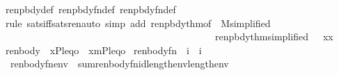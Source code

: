 \begin{isabellebody}
\ renpbdy{\isacharunderscore}{\kern0pt}def\ renpbdy{\isacharunderscore}{\kern0pt}fn{\isacharunderscore}{\kern0pt}def\ renpbdy{}{\isacharunderscore}{\kern0pt}fn{\isacharunderscore}{\kern0pt}def\isanewline
\ \ \isamarkupfalse%
\ {\isacharparenleft}{\kern0pt}rule\ sats{\isacharunderscore}{\kern0pt}iff{\isacharunderscore}{\kern0pt}sats{\isacharunderscore}{\kern0pt}ren{\isacharcomma}{\kern0pt}auto\ simp\ add{\isacharcolon}{\kern0pt}\ renpbdy{}{\isacharunderscore}{\kern0pt}thm{\isacharparenleft}{\kern0pt}{}{\isacharparenright}{\kern0pt}{\isacharbrackleft}{\kern0pt}of\ {\isacharunderscore}{\kern0pt}\ M{\isacharcomma}{\kern0pt}simplified{\isacharbrackright}{\kern0pt}\isanewline
\ \ \ \ \ \ \ \ \ \ \ \ \ \ \ \ \ \ \ \ \ \ \ \ \ \ \ \ \ \ \ \ \ \ \ \ \ \ \ \ \ \ \ \ renpbdy{}{\isacharunderscore}{\kern0pt}thm{\isacharparenleft}{\kern0pt}{}{\isacharparenright}{\kern0pt}{\isacharbrackleft}{\kern0pt}simplified{\isacharcomma}{\kern0pt}\ {\isasymalpha}{\isacharequal}{\kern0pt}{\isasymalpha}\ \ x{\isacharequal}{\kern0pt}x{\isacharbrackright}{\kern0pt}{\isacharparenright}{\kern0pt}%
\endisatagproof
{\isafoldproof}%
%
\isadelimproof
\isanewline
%
\endisadelimproof
\isanewline
%
\isadelimML
\isanewline
%
\endisadelimML
%
\isatagML
{}\isamarkupfalse%
\ {\isachardoublequoteopen}renbody{}{\isachardoublequoteclose}\ \ {\isachardoublequoteopen}{\isacharbrackleft}{\kern0pt}x{\isacharcomma}{\kern0pt}{\isasymalpha}{\isacharcomma}{\kern0pt}P{\isacharcomma}{\kern0pt}leq{\isacharcomma}{\kern0pt}o{\isacharbrackright}{\kern0pt}{\isachardoublequoteclose}\ \ {\isachardoublequoteopen}{\isacharbrackleft}{\kern0pt}{\isasymalpha}{\isacharcomma}{\kern0pt}x{\isacharcomma}{\kern0pt}m{\isacharcomma}{\kern0pt}P{\isacharcomma}{\kern0pt}leq{\isacharcomma}{\kern0pt}o{\isacharbrackright}{\kern0pt}{\isachardoublequoteclose}%
\endisatagML
{\isafoldML}%
%
\isadelimML
\isanewline
%
\endisadelimML
\isanewline
{}\isamarkupfalse%
\ renbody{\isacharunderscore}{\kern0pt}fn\ {\isacharcolon}{\kern0pt}{\isacharcolon}{\kern0pt}\ {\isachardoublequoteopen}i\ {\isasymRightarrow}\ i{\isachardoublequoteclose}\ \isanewline
\ \ {\isachardoublequoteopen}renbody{\isacharunderscore}{\kern0pt}fn{\isacharparenleft}{\kern0pt}env{\isacharparenright}{\kern0pt}\ {\isasymequiv}\ sum{\isacharparenleft}{\kern0pt}renbody{}{\isacharunderscore}{\kern0pt}fn{\isacharcomma}{\kern0pt}id{\isacharparenleft}{\kern0pt}length{\isacharparenleft}{\kern0pt}env{\isacharparenright}{\kern0pt}{\isacharparenright}{\kern0pt}{\isacharcomma}{\kern0pt}{}{\isacharcomma}{\kern0pt}{}{\isacharcomma}{\kern0pt}length{\isacharparenleft}{\kern0pt}env{\isacharparenright}{\kern0pt}{\isacharparenright}{\kern0pt}{\isachardoublequoteclose}\isanewline

\end{isabellebody}
